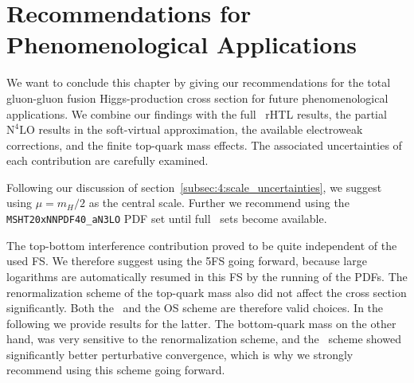 \section{Recommendations for Phenomenological Applications}
We want to conclude this chapter by giving our recommendations for the total gluon-gluon fusion Higgs-production cross section for future phenomenological applications. We combine our findings with the full \NNNLO\ \acs{rHTL} results, the partial $\mathrm{N}^4\mathrm{LO}$ results in the soft-virtual approximation, the available electroweak corrections, and the finite top-quark mass effects. The associated uncertainties of each contribution are carefully examined.

Following our discussion of section~\ref{subsec:4:scale_uncertainties}, we suggest using $\mu = m_H/2$ as the central scale. Further we recommend using the \texttt{MSHT20xNNPDF40\_aN3LO} \acs{PDF} set until full \NNNLO\ sets become available.

The top-bottom interference contribution proved to be quite independent of the used \acs{FS}. We therefore suggest using the 5\acs{FS} going forward, because large logarithms are automatically resumed in this \acs{FS} by the running of the \acs{PDF}s. The renormalization scheme of the top-quark mass also did not affect the cross section significantly. Both the \MS\ and the \acs{OS} scheme are therefore valid choices. In the following we provide results for the latter. The bottom-quark mass on the other hand, was very sensitive to the renormalization scheme, and the \MS\ scheme showed significantly better perturbative convergence, which is why we strongly recommend using this scheme going forward.

